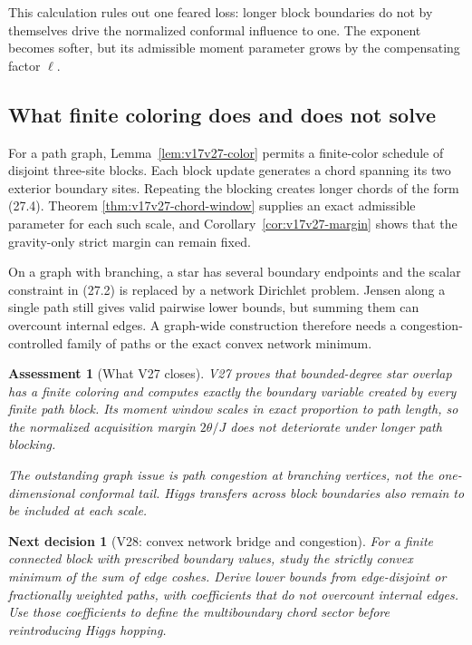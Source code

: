 \documentclass[11pt]{article}
\newtheorem{decision}[theorem]{Next decision}
\newtheorem{assessment}[theorem]{Assessment}
\theoremstyle{remark}
\begin{document}
This calculation rules out one feared loss: longer block boundaries do
not by themselves drive the normalized conformal influence to one.
The exponent becomes softer, but its admissible moment parameter grows
by the compensating factor \(\ell\).

\subsection{What finite coloring does and does not solve}

For a path graph, Lemma~\ref{lem:v17v27-color} permits a finite-color
schedule of disjoint three-site blocks.  Each block update generates a
chord spanning its two exterior boundary sites.  Repeating the blocking
creates longer chords of the form (27.4).  Theorem
\ref{thm:v17v27-chord-window} supplies an exact admissible parameter for
each such scale, and Corollary~\ref{cor:v17v27-margin} shows that the
gravity-only strict margin can remain fixed.

On a graph with branching, a star has several boundary endpoints and
the scalar constraint in (27.2) is replaced by a network Dirichlet
problem.  Jensen along a single path still gives valid pairwise lower
bounds, but summing them can overcount internal edges.  A graph-wide
construction therefore needs a congestion-controlled family of paths
or the exact convex network minimum.

\begin{assessment}[What V27 closes]
\label{ass:v17v27-status}
V27 proves that bounded-degree star overlap has a finite coloring and
computes exactly the boundary variable created by every finite path
block.  Its moment window scales in exact proportion to path length,
so the normalized acquisition margin \(2\theta/J\) does not deteriorate
under longer path blocking.

The outstanding graph issue is path congestion at branching vertices,
not the one-dimensional conformal tail.  Higgs transfers across block
boundaries also remain to be included at each scale.
\end{assessment}

\begin{decision}[V28: convex network bridge and congestion]
\label{dec:v17v27-next}
For a finite connected block with prescribed boundary values, study the
strictly convex minimum of the sum of edge coshes.  Derive lower bounds
from edge-disjoint or fractionally weighted paths, with coefficients
that do not overcount internal edges.  Use those coefficients to define
the multiboundary chord sector before reintroducing Higgs hopping.
\end{decision}
\end{document}
